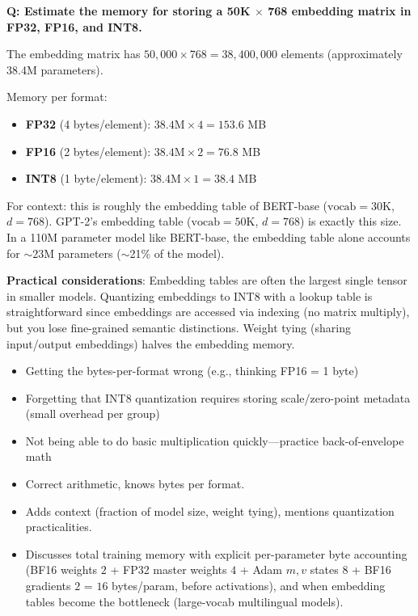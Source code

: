 \begin{interviewq}
\textbf{Q: Estimate the memory for storing a 50K $\times$ 768 embedding matrix in FP32, FP16, and INT8.}

 \quad {} \quad \badgefreq{\freqhigh}

\stronganswer
The embedding matrix has $50{,}000 \times 768 = 38{,}400{,}000$ elements (approximately 38.4M parameters).

Memory per format:
\begin{itemize}
    \item \textbf{FP32} (4 bytes/element): $38.4\text{M} \times 4 = 153.6$ MB
    \item \textbf{FP16} (2 bytes/element): $38.4\text{M} \times 2 = 76.8$ MB
    \item \textbf{INT8} (1 byte/element): $38.4\text{M} \times 1 = 38.4$ MB
\end{itemize}

For context: this is roughly the embedding table of BERT-base ($\text{vocab}=30\text{K}$, $d=768$). GPT-2's embedding table ($\text{vocab}=50\text{K}$, $d=768$) is exactly this size. In a 110M parameter model like BERT-base, the embedding table alone accounts for $\sim$23M parameters ($\sim$21\% of the model).

\textbf{Practical considerations}: Embedding tables are often the largest single tensor in smaller models. Quantizing embeddings to INT8 with a lookup table is straightforward since embeddings are accessed via indexing (no matrix multiply), but you lose fine-grained semantic distinctions. Weight tying (sharing input/output embeddings) halves the embedding memory.

\redflags
\begin{itemize}
    \item Getting the bytes-per-format wrong (e.g., thinking FP16 = 1 byte)
    \item Forgetting that INT8 quantization requires storing scale/zero-point metadata (small overhead per group)
    \item Not being able to do basic multiplication quickly---practice back-of-envelope math
\end{itemize}


\goodgreat
\begin{itemize}
    \item {} Correct arithmetic, knows bytes per format.
    \item {} Adds context (fraction of model size, weight tying), mentions quantization practicalities.
    \item {} Discusses total training memory with explicit per-parameter byte accounting (BF16 weights $2$ + FP32 master weights $4$ + Adam $m,v$ states $8$ + BF16 gradients $2$ = $16$ bytes/param, before activations), and when embedding tables become the bottleneck (large-vocab multilingual models).
\end{itemize}


\end{interviewq}
